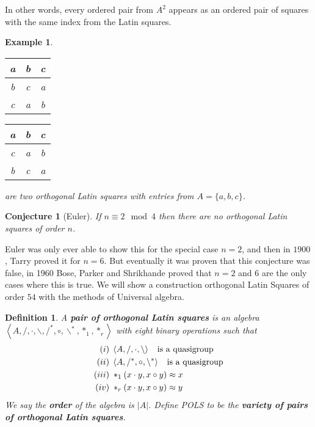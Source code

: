 \documentclass[12pt,a4paper]{article}
\newtheorem{example}[theorem]{Example}
\newtheorem{conjecture}[theorem]{Conjecture}
\newtheorem{definition}[theorem]{Definition}
\begin{document}
In other words, every ordered pair from $A^2$ appears as an ordered pair of squares with the same index from the Latin squares.

\begin{example}
    \begin{tabular}{|c|c|c|}
        \hline
        a & b & c\\
        \hline
        b & c & a\\
        \hline
        c & a & b\\
        \hline
    \end{tabular}\;\;\;
    \begin{tabular}{|c|c|c|}
        \hline
        a & b & c\\
        \hline
        c & a & b\\
        \hline
        b & c & a\\
        \hline
    \end{tabular}
    are two orthogonal Latin squares with entries from $A=\{a,b,c\}$.
\end{example}

\begin{conjecture}[Euler]
If $n\equiv 2 \mod 4$ then there are no orthogonal Latin squares of order $n$.
\end{conjecture}

Euler was only ever able to show this for the special case $n=2$, and then in $1900$, Tarry proved it for $n=6$.
But eventually it was proven that this conjecture was false, in 1960 Bose, Parker and Shrikhande proved that $n=2$ and $6$ are the only cases where this is true.
We will show a construction orthogonal Latin Squares of order $54$ with the methods of Universal algebra.

\begin{definition}
    A \textbf{pair of orthogonal Latin squares} is an algebra $\left<A,/,\cdot,\backslash,/^*,\circ,\backslash^*,*_1,*_r\right>$ with eight binary operations such that
    \begin{align*}
        (i)&\; \left<A,/,\cdot,\backslash\right> \text{\;\; is a quasigroup}\\
        (ii)&\; \left<A,/^*,\circ,\backslash^*\right> \text{\;\; is a quasigroup}\\
        (iii)&\; *_1(x\cdot y,x\circ y) \approx x\\
        (iv)&\; *_r(x\cdot y,x\circ y)\approx y
    \end{align*}
    We say the \textbf{order} of the algebra is $|A|$.
    Define POLS to be the \textbf{variety of pairs of orthogonal Latin squares}.
\end{definition}
\end{document}
